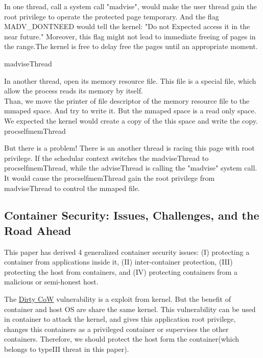 \documentclass[12pt,a4paper,oneside,draft]{IEEEconf}
\begin{document}
In one thread, call a system call "madvise", would make the user thread gain the root
privilege to operate the protected page temporary. And the flag MADV\_DONTNEED would
tell the kernel: "Do not Expected access it in the near future.\cite{Madvise}" Moreover,
this flag might not lead to immediate freeing of pages in the range.The kernel is free
to delay free the pages until an appropriate moment.\cite{Madvise}

\hypertarget{madvise}{madviseThread}


In another thread, open its memory resource file. This file is a special file, which allow
the process reads its memory by itself.\\
Than, we move the printer of file descriptor of the memory resource file to the mmaped
space. And try to write it. But the mmaped space is a read only space. We expected the
kernel would create a copy of the this space and write the copy\cite{root_exploit}.
\hypertarget{procself}{procselfmemThread}


But there is a problem! There is an another thread is racing this page with root privilege.
If the schedular context switches the madviseThread to procselfmemThread, while the
adviseThread is calling the "madvise" system call. It would cause the procselfmemThread
gain the root privilege from madviseThread to control the mmaped file.

\subsection{Container Security: Issues, Challenges, and the Road Ahead\cite{Road_Ahead}}
This paper has derived 4 generalized container security issues: (\RN{1}) protecting a
container from applications inside it, (\RN{2}) inter-container protection, (\RN{3})
protecting the host from containers, and (\RN{4}) protecting containers from a malicious
or semi-honest host.\cite{Road_Ahead}

The \hyperlink{dirty cow}{Dirty CoW} vulnerability is a exploit from kernel. But the benefit
of container and host OS are share the same kernel. This vulnerability can be used in
container to attack the kernel, and gives this application root privilege, changes this
containers as a privileged container or supervises the other containers. Therefore, we should
protect the host form the container(which belongs to type\RN{3} threat in this paper).
\end{document}
